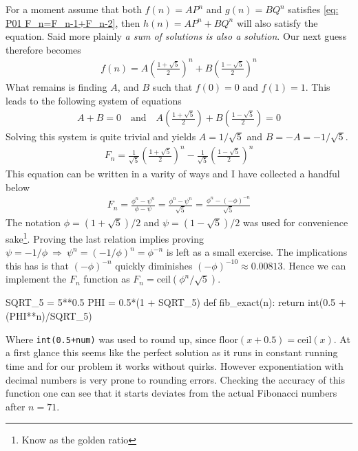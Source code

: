 For a moment assume that both $f(n) = A P^n$ and $g(n) = B Q^n$ satisfies \cref{eq: P01 F_n=F_n-1+F_n-2}, then $h(n) = A P^n + B Q^n$
will also satisfy the equation. Said more plainly \emph{a sum of solutions is also a solution}. Our next guess therefore becomes
%
\begin{align*}
	f(n) = A \left( \frac{1 + \sqrt{5}}{2} \right)^n + B \left( \frac{1 - \sqrt{5}}{2} \right)^n
\end{align*}
%
What remains is finding $A$, and $B$ such that $f(0) = 0$ and $f(1) = 1$. This leads to the following system of equations
%
\begin{align*}
	A + B = 0 \quad \text{and} \quad 
	A \left( \frac{1 + \sqrt{5}}{2} \right) + B \left( \frac{1 - \sqrt{5}}{2} \right) = 0
\end{align*}
%
Solving this system is quite trivial and yields $A = 1/\sqrt{5}$ and $B = -A = -1/\sqrt{5}$. 
%
\begin{align*}
	F_n = \frac{1}{\sqrt{5}} \left( \frac{1 + \sqrt{5}}{2} \right)^n - \frac{1}{\sqrt{5}} \left( \frac{1 - \sqrt{5}}{2} \right)^n
\end{align*}
%
This equation can be written in a varity of ways and I have collected a handful below
\begin{align}
\label{eq: PE02 closed-form-fibonacci}
	   F_n 
	= \frac{\phi^n - \psi^n}{\phi - \psi} 
	= \frac{\phi^n - \psi^n}{\sqrt{5}}
	= \frac{\phi^n - (-\phi)^{-n}}{\sqrt{5}}
\end{align}
The notation $\phi = (1 + \sqrt{5})/2$ and $\psi = (1 - \sqrt{5})/2$ was used for convenience sake\footnote{Know as the golden ratio}.
Proving the last relation implies proving $\psi = -1/\phi \ \Longrightarrow \ \psi^n = (-1/\phi)^n = \phi^{-n}$ is left as a small exercise.  
The implications this has is that $(-\phi)^{-n}$ quickly diminishes $(-\phi)^{-10} \approx \num{0.00813}$. Hence we can implement the $F_n$
function as $F_n = \text{ceil}( \phi^n / \sqrt{5})$.
%
\begin{pythoncode}
	SQRT_5 = 5**0.5
	PHI = 0.5*(1 + SQRT_5)
	def fib_exact(n):
	    return int(0.5 + (PHI**n)/SQRT_5)
\end{pythoncode}
%
Where \verb|int(0.5+num)| was used to round up, since $\text{floor}(x+0.5) = \text{ceil}(x)$. At a first glance this seems like the perfect solution
as it runs in constant running time and for our problem it works without quirks. However exponentiation with decimal numbers is very prone to rounding errors.
Checking the accuracy of this function one can see that it starts deviates from the actual Fibonacci numbers after $n = 71$. 
